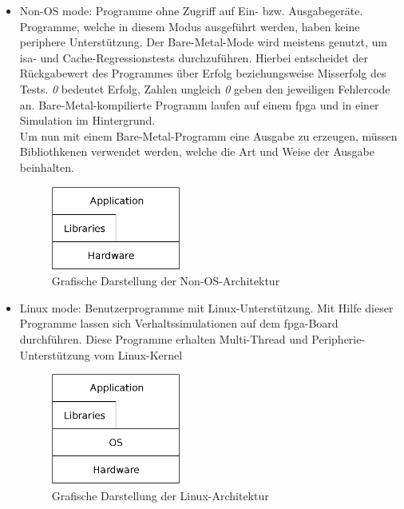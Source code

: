 \begin{itemize}
  \item Non-OS mode: Programme ohne Zugriff auf Ein- bzw. Ausgabegeräte. Programme, welche in diesem Modus ausgeführt werden, haben keine periphere Unterstützung.
        Der Bare-Metal-Mode wird meistens genutzt, um \ac{isa}- und Cache-Regressionstests durchzuführen. Hierbei entscheidet der Rückgabewert des Programmes über Erfolg beziehungsweise Misserfolg
        des Tests. \emph{0} bedeutet Erfolg, Zahlen ungleich \emph{0} geben den jeweiligen Fehlercode an. Bare-Metal-kompilierte Programm laufen auf einem \ac{fpga} und in einer Simulation
        im Hintergrund. \\
        Um nun mit einem Bare-Metal-Programm eine Ausgabe zu erzeugen, müssen Bibliothkenen verwendet werden, welche die Art und Weise der Ausgabe beinhalten.\\

        \begin{figure}[H]
        \centering
        \includegraphics[width=0.4\textwidth]{Hauptteil/baremetal.eps}
        \caption{Grafische Darstellung der Non-OS-Architektur}\label{fig:baremetal}
        \end{figure}

  \item Linux mode: Benutzerprogramme mit Linux-Unterstützung. Mit Hilfe dieser Programme lassen sich Verhaltssimulationen auf dem \ac{fpga}-Board durchführen. Diese Programme
  erhalten Multi-Thread und Peripherie-Unterstützung vom Linux-Kernel\cite{lowrisc}\\

  \begin{figure}[H]
  \centering
  \includegraphics[width=0.4\textwidth]{Hauptteil/linuxmode.eps}
  \caption{Grafische Darstellung der Linux-Architektur}\label{fig:linuxmode}
  \end{figure}
\end{itemize}




